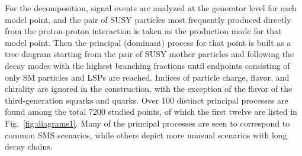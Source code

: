 For the decomposition, signal events are analyzed at the generator
level for each model point, and the pair of SUSY particles most frequently produced directly
from the proton-proton interaction is taken as the production 
mode for that model point. Then the principal (dominant) process for
that point is built as a tree diagram starting from the pair of SUSY mother
particles and following the decay modes with the highest branching
fractions until endpoints consisting of only SM particles
and LSPs are reached. Indices of particle charge, flavor,  and chirality are ignored in the
construction, with the exception of the flavor of the third-generation squarks and quarks.
Over 100 distinct principal processes are found
among the total 7200 studied points, of which the first twelve
are listed in Fig.~\ref{fig:diagrams1}. Many
of the principal processes are seen to correspond to common SMS scenarios, while others
depict more unusual scenarios with long decay chains. 

